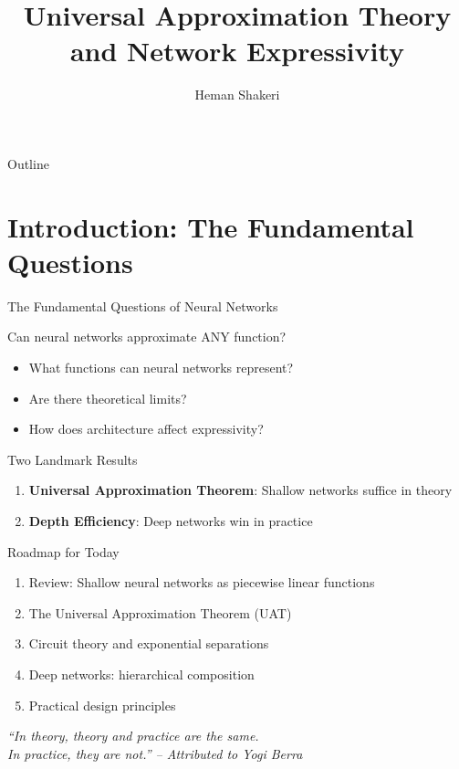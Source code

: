 \documentclass[xcolor=svgnames, 10pt, handout, standalone]{beamer}
\title[Universal Approximation]{Universal Approximation Theory\\and Network Expressivity}
\author{Heman Shakeri}
\date{}
\newcommand{\1}{\mathbf{1}}
\begin{document}
\begin{frame}
\titlepage
\end{frame}

\begin{frame}{Outline}
\tableofcontents
\end{frame}

\section{Introduction: The Fundamental Questions}

\begin{frame}{The Fundamental Questions of Neural Networks}
\begin{block}{Can neural networks approximate ANY function?}
\begin{itemize}
    \item What functions can neural networks represent?
    \item Are there theoretical limits?
    \item How does architecture affect expressivity?
\end{itemize}
\end{block}

\begin{alertblock}{Two Landmark Results}
\begin{enumerate}
    \item \textbf{Universal Approximation Theorem}: Shallow networks suffice in theory
    \item \textbf{Depth Efficiency}: Deep networks win in practice
\end{enumerate}
\end{alertblock}
\end{frame}

\begin{frame}{Roadmap for Today}
\begin{enumerate}
    \item<1-> Review: Shallow neural networks as piecewise linear functions
    \item<2-> The Universal Approximation Theorem (UAT)
    \item<3-> Circuit theory and exponential separations
    \item<4-> Deep networks: hierarchical composition
    \item<5-> Practical design principles
\end{enumerate}

\begin{center}
\textit{``In theory, theory and practice are the same.\\
In practice, they are not.'' -- Attributed to Yogi Berra}
\end{center}
\end{frame}
\end{document}
